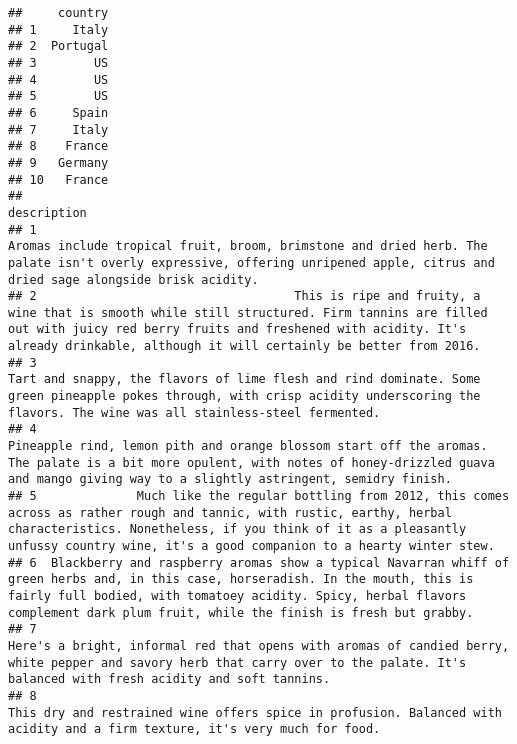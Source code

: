 \documentclass[
]{article}
\begin{document}
\begin{verbatim}
##     country
## 1     Italy
## 2  Portugal
## 3        US
## 4        US
## 5        US
## 6     Spain
## 7     Italy
## 8    France
## 9   Germany
## 10   France
##                                                                                                                                                                                                                                                              description
## 1                                                                                           Aromas include tropical fruit, broom, brimstone and dried herb. The palate isn't overly expressive, offering unripened apple, citrus and dried sage alongside brisk acidity.
## 2                                    This is ripe and fruity, a wine that is smooth while still structured. Firm tannins are filled out with juicy red berry fruits and freshened with acidity. It's  already drinkable, although it will certainly be better from 2016.
## 3                                                                             Tart and snappy, the flavors of lime flesh and rind dominate. Some green pineapple pokes through, with crisp acidity underscoring the flavors. The wine was all stainless-steel fermented.
## 4                                                                Pineapple rind, lemon pith and orange blossom start off the aromas. The palate is a bit more opulent, with notes of honey-drizzled guava and mango giving way to a slightly astringent, semidry finish.
## 5              Much like the regular bottling from 2012, this comes across as rather rough and tannic, with rustic, earthy, herbal characteristics. Nonetheless, if you think of it as a pleasantly unfussy country wine, it's a good companion to a hearty winter stew.
## 6  Blackberry and raspberry aromas show a typical Navarran whiff of green herbs and, in this case, horseradish. In the mouth, this is fairly full bodied, with tomatoey acidity. Spicy, herbal flavors complement dark plum fruit, while the finish is fresh but grabby.
## 7                                                                                  Here's a bright, informal red that opens with aromas of candied berry, white pepper and savory herb that carry over to the palate. It's balanced with fresh acidity and soft tannins.
## 8                                                                                                                                             This dry and restrained wine offers spice in profusion. Balanced with acidity and a firm texture, it's very much for food.

\end{verbatim}
\end{document}
